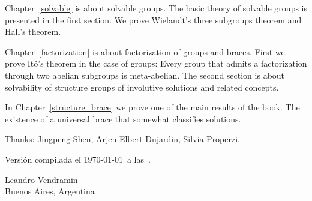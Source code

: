 Chapter~\ref{solvable} is about solvable groups. The basic theory of solvable groups is presented in the first section. We
prove Wielandt's three subgroups theorem and Hall's theorem. 

Chapter~\ref{factorization} is about factorization of groups and braces. First
we prove It\^o's theorem in the case of groups: Every group that admits a factorization through two 
abelian subgroups is meta-abelian. The second section is about solvability of structure groups
of involutive solutions and related concepts. 

In Chapter~\ref{structure_brace} we prove one of the main results of the book. The existence of a universal brace
that somewhat classifies solutions. 




Thanks: Jingpeng Shen, Arjen Elbert Dujardin, 
Silvia Properzi. 

\medskip
Versión compilada el \today~a las~\currenttime.

\begin{flushright}
Leandro Vendramin\\Buenos Aires, Argentina\par
\end{flushright}
